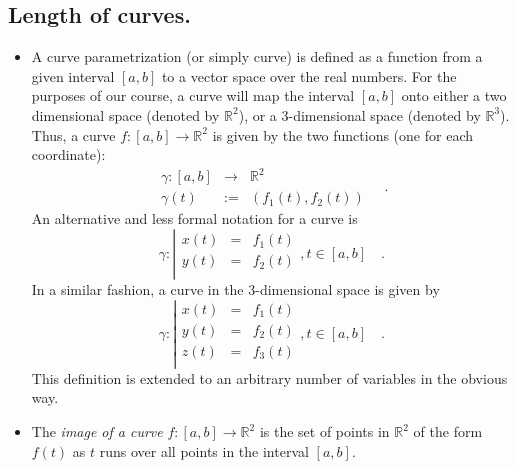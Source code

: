 \documentclass[12pt]{book}
\newcommand{\eqdef}{\textbf{:=}}
\begin{document}
\subsection{Length of curves.}\label{secCurveLength}
\begin{itemize}
\item {} A curve parametrization (or simply curve) is defined as a function from a given interval $[a,b]$ to a vector space over the real numbers. For the purposes of our course, a curve will map the interval $[a,b]$ onto either a two dimensional space (denoted by $\mathbb R^2$), or a 3-dimensional space (denoted by $\mathbb R^3$). Thus, a curve $f:[a,b]\to \mathbb R^2$ is given by the two functions (one for each coordinate):
\[
\begin{array}{rcl}
\gamma:[a,b]&\to& \mathbb R^2\\
\gamma(t)&\eqdef& (f_1(t), f_2(t))
\end{array}\quad .
\]
An alternative and less formal notation for a curve is
\[
\gamma:\left| 
\begin{array}{rcl}
x(t)&=&f_1(t)\\
y(t)&=&f_2(t)\\
\end{array}\right., t\in [a,b]\quad .
\]
In a similar fashion, a curve in the 3-dimensional space is given by 
\[
\gamma:\left| 
\begin{array}{rcl}
x(t)&=&f_1(t)\\
y(t)&=&f_2(t)\\
z(t)&=&f_3(t)\\
\end{array}\right., t\in [a,b]\quad .
\]
This definition is extended to an arbitrary number of variables in the obvious way.
\item {}The \emph{image of a curve} $f:[a,b]\to \mathbb R^2$ is the set of points in $\mathbb R^2$ of the form $f(t)$ as $t$ runs over all points in the interval $[a,b]$.


\end{itemize}
\end{document}
